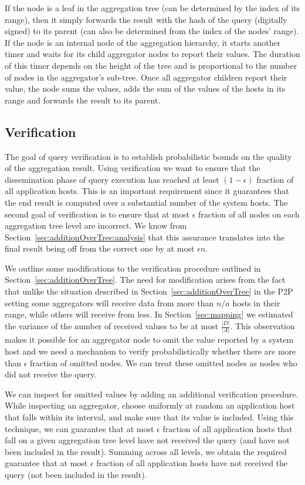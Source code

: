 \documentclass[11pt,twocolumn]{MyTightStyle}
\theoremstyle{plain}
\theoremstyle{definition}
\theoremstyle{remark}
\numberwithin{equation}{section}
\begin{document}
If the node is a leaf in the
aggregation tree (can be determined by the index of its range), then
it simply forwards the result with the hash of the query (digitally
signed) to its parent (can also be determined from the index of the
nodes' range). If the node is an internal node of the aggregation
hierarchy, it starts another timer and waits for its child aggregator
nodes to report their values. The duration of this timer depends on
the height of the tree and is proportional to the number of nodes in
the aggregator's sub-tree. Once all aggregator children report their
value, the node sums the values, adds the sum of the values of the
hosts in its range and forwards the result to its parent. 

\subsection{Verification}
The goal of query verification is to establish probabilistic bounds on
the quality of the aggregation result. Using verification we want to
ensure that the dissemination phase of query execution has reached at
least $(1-\epsilon)$ fraction of all application hosts. This is an
important requirement since it guarantees that the end result is
computed over a substantial number of the system hosts. The second
goal of verification is to ensure that at most $\epsilon$ fraction of
all nodes on each aggregation tree level are incorrect. We know from
Section~\ref{sec:additionOverTree:analysis} that this assurance translates into the
final result being off from the correct one by at most $\epsilon n$. 

We outline some modifications to the verification procedure outlined
in Section~\ref{sec:additionOverTree}. The need for modification arises
from the fact that unlike the situation described in
Section~\ref{sec:additionOverTree} in the P2P setting some aggregators will
receive data from more than $n/a$ hosts in their range, while others will
receive from less. In Section~\ref{sec:mapping} we estimated the
variance of the number of received values to be at most
$\frac{|D|}{|A|}$. This observation makes it possible for an aggregator
node to omit the value reported by a system host and we need a mechanism
to verify probabilistically whether there are more than $\epsilon$
fraction of omitted nodes. We can treat these omitted nodes as nodes
who did not receive the query.

We can inspect for omitted values by adding an additional verification
procedure. While inspecting an aggregator, choose uniformly at random
an application host that falls within its interval, and make sure that
its value is included. Using this technique, we can guarantee that at
most $\epsilon$ fraction of all application hosts that fall on a given
aggregation tree level have not received the query (and have not been
included in the result). Summing across all levels, we obtain the
required guarantee that at most $\epsilon$ fraction of all application
hosts have not received the query (not been included in the result). 
\end{document}
